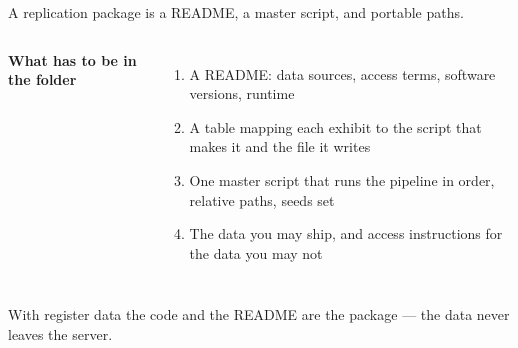 \documentclass[aspectratio=169, 10pt]{beamer}
\begin{document}
\begin{frame}{A replication package is a README, a master script, and portable paths.}
\begin{columns}[t]
\textbf{What has to be in the folder}
\begin{enumerate}\small\setlength{\itemsep}{1pt}
  \item A README: data sources, access terms, software versions, runtime
  \item A table mapping each exhibit to the script that makes it and the file it writes
  \item One master script that runs the pipeline in order, relative paths, seeds set
  \item The data you may ship, and access instructions for the data you may not
\end{enumerate}

\small

\end{columns}

\begin{sowhat}
With register data the code and the README are the package --- the data never leaves the server.
\end{sowhat}
\end{frame}

\sourceline{}



\end{document}
